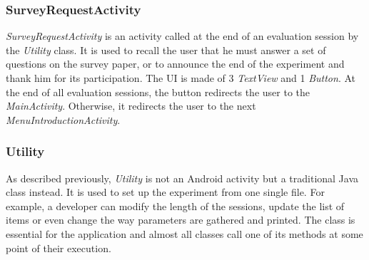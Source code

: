 \subsubsection{SurveyRequestActivity}
\textit{SurveyRequestActivity} is an activity called at the end of an 
evaluation session by the \textit{Utility} class. It is used to recall the user 
that he must answer a set of questions on the survey paper, or to announce the 
end of the experiment and thank him for its participation. The UI is made of 3 
\textit{TextView} and 1 \textit{Button}. At the end of all evaluation 
sessions, the button redirects the user to the \textit{MainActivity}. 
Otherwise, it redirects the user to the next \textit{MenuIntroductionActivity}.

\subsubsection{Utility}
As described previously, \textit{Utility} is not an Android activity but a 
traditional Java class instead. It is used to set up the experiment from one 
single file. For example, a developer can modify the length of the sessions, 
update the list of items or even change the way parameters are gathered and 
printed. The class is essential for the application and almost all classes call 
one of its methods at some point of their execution.